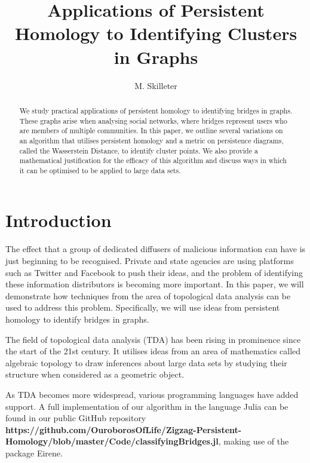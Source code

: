 \documentclass[12pt,a4paper]{amsart}
\numberwithin{equation}{section}
\theoremstyle{plain}
\theoremstyle{definition}
\begin{document}
\title{Applications of Persistent Homology to Identifying Clusters in Graphs }


\author[]{M. Skilleter}

\address{Australian National University \\ Mathematical Sciences Institute} 


\begin{abstract} We study practical applications of persistent homology to identifying bridges in graphs. These graphs arise when analysing social networks, where bridges represent users who are members of multiple communities. In this paper, we outline several variations on an algorithm that utilises persistent homology and a metric on persistence diagrams, called the Wasserstein Distance, to identify cluster points. We also provide a mathematical justification for the efficacy of this algorithm and discuss ways in which it can be optimised to be applied to large data sets.
\end{abstract}

\maketitle

\section*{Introduction} The effect that a group of dedicated diffusers of malicious information can have is just beginning to be recognised. Private and state agencies are using platforms such as Twitter and Facebook to push their ideas, and the problem of identifying these information distributors is becoming more important. In this paper, we will demonstrate how techniques from the area of topological data analysis can be used to address this problem. Specifically, we will use ideas from persistent homology to identify bridges in graphs.

The field of topological data analysis (TDA) has been rising in prominence since the start of the 21st century. It utilises ideas from an area of mathematics called algebraic topology to draw inferences about large data sets by studying their structure when considered as a geometric object. 

As TDA becomes more widespread, various programming languages have added support. A full implementation of our algorithm in the language Julia can be found in our public GitHub repository \small{\textbf{https://github.com/OuroborosOfLife/Zigzag-Persistent-Homology/blob/master/Code/classifyingBridges.jl}}, making use of the package Eirene.
\end{document}
